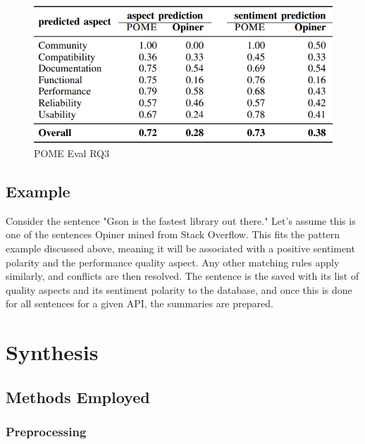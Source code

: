 \documentclass[a4paper,10pt, bibliography=totocnumbered]{scrreprt}
\begin{document}
\begin{figure}[!h]
    \centering
    \includegraphics[scale=0.6]{../images/Thema9_POMEEval3.PNG}
    \caption{POME Eval RQ3}
    \label{POMEEval3}
\end{figure}

\section{Example}

Consider the sentence "Gson is the fastest library out there." Let's assume this is one of the sentences Opiner mined from Stack Overflow. This fits the pattern example discussed above, meaning it will be associated with a positive sentiment polarity and the performance quality aspect. Any other matching rules apply similarly, and conflicts are then resolved. The sentence is the saved with its list of quality aspects and its sentiment polarity to the database, and once this is done for all sentences for a given API, the summaries are prepared. 

\chapter{Synthesis}

\section{Methods Employed}

\subsection{Preprocessing}
\end{document}
